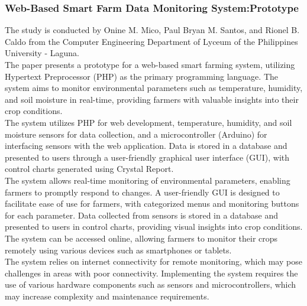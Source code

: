 \documentclass[12pt, a4paper]{article}
\begin{document}
\subsubsection{Web-Based Smart Farm Data Monitoring System:Prototype}
The study is conducted by Onine M. Mico, Paul Bryan M. Santos, and Rionel B. Caldo from the Computer Engineering Department of Lyceum of the Philippines University - Laguna.\\
The paper presents a prototype for a web-based smart farming system, utilizing Hypertext Preprocessor (PHP) as the primary programming language. The system aims to monitor environmental parameters such as temperature, humidity, and soil moisture in real-time, providing farmers with valuable insights into their crop conditions.\\
The system utilizes PHP for web development, temperature, humidity, and soil moisture sensors for data collection, and a microcontroller (Arduino) for interfacing sensors with the web application. Data is stored in a database and presented to users through a user-friendly graphical user interface (GUI), with control charts generated using Crystal Report.\\
The system allows real-time monitoring of environmental parameters, enabling farmers to promptly respond to changes. A user-friendly GUI is designed to facilitate ease of use for farmers, with categorized menus and monitoring buttons for each parameter. Data collected from sensors is stored in a database and presented to users in control charts, providing visual insights into crop conditions. The system can be accessed online, allowing farmers to monitor their crops remotely using various devices such as smartphones or tablets.\\
The system relies on internet connectivity for remote monitoring, which may pose challenges in areas with poor connectivity. Implementing the system requires the use of various hardware components such as sensors and microcontrollers, which may increase complexity and maintenance requirements.
\end{document}
